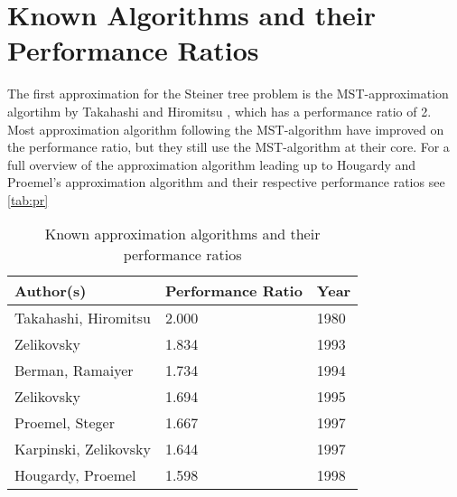 \section{Known Algorithms and their Performance Ratios}
The first approximation for the Steiner tree problem is the MST-approximation algortihm by Takahashi and Hiromitsu \cite{takahashi1980approximate}, which has a performance ratio of 2. Most approximation algorithm following the MST-algorithm have improved on the performance ratio, but they still use the MST-algorithm at their core.
For a full overview of the approximation algorithm leading up to Hougardy and Proemel's approximation algorithm and their respective performance ratios see \autoref{tab:pr}
\begin{table}[htbp]
  \caption[Known Perfomance Ratios]{Known approximation algorithms and their performance ratios \cite{HoPr99}}\label{tab:pr}
  \centering
  \begin{tabular}{l l l}
    \toprule
      Author(s) & Performance Ratio & Year \\
    \midrule
      Takahashi, Hiromitsu & 2.000 & 1980 \\
      Zelikovsky & 1.834 & 1993 \\
      Berman, Ramaiyer & 1.734 & 1994 \\
      Zelikovsky & 1.694 & 1995 \\
      Proemel, Steger & 1.667 & 1997 \\
      Karpinski, Zelikovsky & 1.644 & 1997 \\
      Hougardy, Proemel & 1.598 & 1998 \\    
\bottomrule
  \end{tabular}
\end{table}

